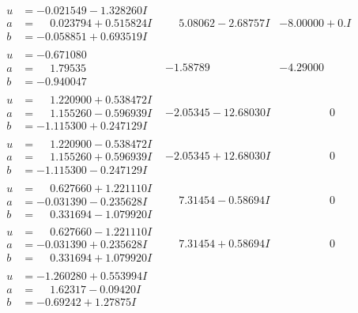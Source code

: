 \documentclass[1p]{elsarticle_modified}
\theoremstyle{definition}
\begin{document}
$$\begin{array}{c|c|c}
\begin{aligned}
u &= -0.021549 - 1.328260 I \\
a &= \phantom{-}0.023794 + 0.515824 I \\
b &= -0.058851 + 0.693519 I\end{aligned}
 & \phantom{-}5.08062 - 2.68757 I & -8.00000 + 0. I\phantom{ +0.000000I} \\ \hline\begin{aligned}
u &= -0.671080\phantom{ +0.000000I} \\
a &= \phantom{-}1.79535\phantom{ +0.000000I} \\
b &= -0.940047\phantom{ +0.000000I}\end{aligned}
 & -1.58789\phantom{ +0.000000I} & -4.29000\phantom{ +0.000000I} \\ \hline\begin{aligned}
u &= \phantom{-}1.220900 + 0.538472 I \\
a &= \phantom{-}1.155260 - 0.596939 I \\
b &= -1.115300 + 0.247129 I\end{aligned}
 & -2.05345 - 12.68030 I & \phantom{-0.000000 } 0 \\ \hline\begin{aligned}
u &= \phantom{-}1.220900 - 0.538472 I \\
a &= \phantom{-}1.155260 + 0.596939 I \\
b &= -1.115300 - 0.247129 I\end{aligned}
 & -2.05345 + 12.68030 I & \phantom{-0.000000 } 0 \\ \hline\begin{aligned}
u &= \phantom{-}0.627660 + 1.221110 I \\
a &= -0.031390 - 0.235628 I \\
b &= \phantom{-}0.331694 - 1.079920 I\end{aligned}
 & \phantom{-}7.31454 - 0.58694 I & \phantom{-0.000000 } 0 \\ \hline\begin{aligned}
u &= \phantom{-}0.627660 - 1.221110 I \\
a &= -0.031390 + 0.235628 I \\
b &= \phantom{-}0.331694 + 1.079920 I\end{aligned}
 & \phantom{-}7.31454 + 0.58694 I & \phantom{-0.000000 } 0 \\ \hline\begin{aligned}
u &= -1.260280 + 0.553994 I \\
a &= \phantom{-}1.62317 - 0.09420 I \\
b &= -0.69242 + 1.27875 I\end{aligned}

\end{array}$$
\end{document}
